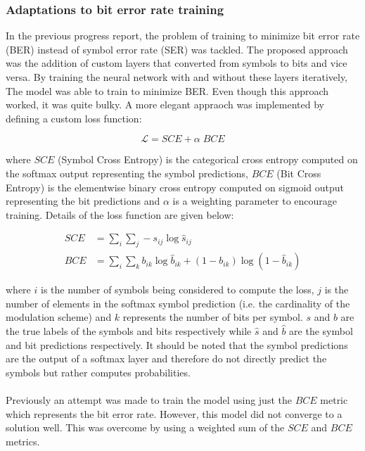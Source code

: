 \subsubsection{Adaptations to bit error rate training}
        
    In the previous progress report, the problem of training to minimize bit error rate (BER) instead of symbol error rate (SER) was tackled. The proposed approach was the addition of custom layers that converted from symbols to bits and vice versa. By training the neural network with and without these layers iteratively, The model was able to train to minimize BER. Even though this approach worked, it was quite bulky. A more elegant appraoch was implemented by defining a custom loss function:
    
    \begin{equation*}
        \mathcal{L} = SCE + \alpha \; BCE
    \end{equation*}
    
    where $SCE$ (Symbol Cross Entropy) is the categorical cross entropy computed on the softmax output representing the symbol predictions, $BCE$ (Bit Cross Entropy) is the elementwise binary cross entropy computed on sigmoid output representing the bit predictions and $\alpha$ is a weighting parameter to encourage training. Details of the loss function are given below:
    
    \begin{equation*}
        \begin{split}
            SCE &= \sum_{i}\sum_{j}-s_{ij}\log\hat{s}_{ij} \\
            BCE &= \sum_{i}\sum_{k}b_{ik}\log\hat{b}_{ik} + \left(1-b_{ik}\right)\log\left(1-\hat{b}_{ik}\right)
        \end{split}
    \end{equation*}
    
    where $i$ is the number of symbols being considered to compute the loss, $j$ is the number of elements in the softmax symbol prediction (i.e. the cardinality of the modulation scheme) and $k$ represents the number of bits per symbol. $s$ and $b$ are the true labels of the symbols and bits respectively while $\hat{s}$ and $\hat{b}$ are the symbol and bit predictions respectively. It should be noted that the symbol predictions are the output of a softmax layer and therefore do not directly predict the symbols but rather computes probabilities. \\
    \\
    Previously an attempt was made to train the model using just the $BCE$ metric which represents the bit error rate. However, this model did not converge to a solution well. This was overcome by using a weighted sum of the $SCE$ and $BCE$ metrics. 
    
